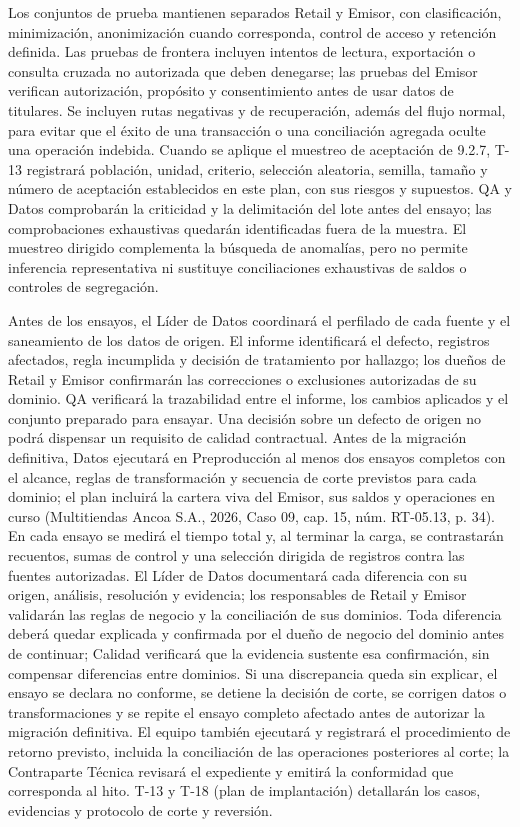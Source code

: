 \documentclass[11pt]{article}
\begin{document}
Los conjuntos de prueba mantienen separados Retail y Emisor, con clasificación, minimización, anonimización cuando corresponda, control de acceso y retención definida. Las pruebas de frontera incluyen intentos de lectura, exportación o consulta cruzada no autorizada que deben denegarse; las pruebas del Emisor verifican autorización, propósito y consentimiento antes de usar datos de titulares. Se incluyen rutas negativas y de recuperación, además del flujo normal, para evitar que el éxito de una transacción o una conciliación agregada oculte una operación indebida. Cuando se aplique el muestreo de aceptación de 9.2.7, T-13 registrará población, unidad, criterio, selección aleatoria, semilla, tamaño y número de aceptación establecidos en este plan, con sus riesgos y supuestos. QA y Datos comprobarán la criticidad y la delimitación del lote antes del ensayo; las comprobaciones exhaustivas quedarán identificadas fuera de la muestra. El muestreo dirigido complementa la búsqueda de anomalías, pero no permite inferencia representativa ni sustituye conciliaciones exhaustivas de saldos o controles de segregación.

Antes de los ensayos, el Líder de Datos coordinará el perfilado de cada fuente y el saneamiento de los datos de origen. El informe identificará el defecto, registros afectados, regla incumplida y decisión de tratamiento por hallazgo; los dueños de Retail y Emisor confirmarán las correcciones o exclusiones autorizadas de su dominio. QA verificará la trazabilidad entre el informe, los cambios aplicados y el conjunto preparado para ensayar. Una decisión sobre un defecto de origen no podrá dispensar un requisito de calidad contractual. Antes de la migración definitiva, Datos ejecutará en Preproducción al menos dos ensayos completos con el alcance, reglas de transformación y secuencia de corte previstos para cada dominio; el plan incluirá la cartera viva del Emisor, sus saldos y operaciones en curso (Multitiendas Ancoa S.A., 2026, Caso 09, cap. 15, núm. RT-05.13, p. 34). En cada ensayo se medirá el tiempo total y, al terminar la carga, se contrastarán recuentos, sumas de control y una selección dirigida de registros contra las fuentes autorizadas. El Líder de Datos documentará cada diferencia con su origen, análisis, resolución y evidencia; los responsables de Retail y Emisor validarán las reglas de negocio y la conciliación de sus dominios. Toda diferencia deberá quedar explicada y confirmada por el dueño de negocio del dominio antes de continuar; Calidad verificará que la evidencia sustente esa confirmación, sin compensar diferencias entre dominios. Si una discrepancia queda sin explicar, el ensayo se declara no conforme, se detiene la decisión de corte, se corrigen datos o transformaciones y se repite el ensayo completo afectado antes de autorizar la migración definitiva. El equipo también ejecutará y registrará el procedimiento de retorno previsto, incluida la conciliación de las operaciones posteriores al corte; la Contraparte Técnica revisará el expediente y emitirá la conformidad que corresponda al hito. T-13 y T-18 (plan de implantación) detallarán los casos, evidencias y protocolo de corte y reversión.
\end{document}
